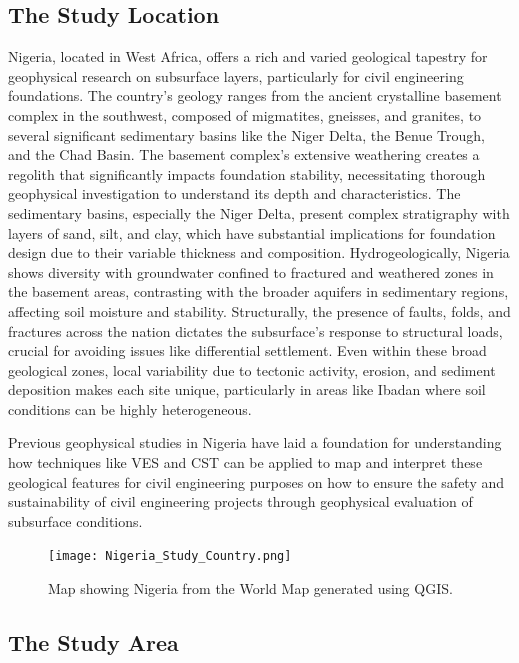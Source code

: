 \documentclass[12pt,a4paper]{report}
\begin{document}
\subsection{The Study Location}
Nigeria, located in West Africa, offers a rich and varied geological tapestry for geophysical research on subsurface layers, particularly for civil engineering foundations. The country's geology ranges from the ancient crystalline basement complex in the southwest, composed of migmatites, gneisses, and granites, to several significant sedimentary basins like the Niger Delta, the Benue Trough, and the Chad Basin. The basement complex's extensive weathering creates a regolith that significantly impacts foundation stability, necessitating thorough geophysical investigation to understand its depth and characteristics. The sedimentary basins, especially the Niger Delta, present complex stratigraphy with layers of sand, silt, and clay, which have substantial implications for foundation design due to their variable thickness and composition. Hydrogeologically, Nigeria shows diversity with groundwater confined to fractured and weathered zones in the basement areas, contrasting with the broader aquifers in sedimentary regions, affecting soil moisture and stability. Structurally, the presence of faults, folds, and fractures across the nation dictates the subsurface's response to structural loads, crucial for avoiding issues like differential settlement. Even within these broad geological zones, local variability due to tectonic activity, erosion, and sediment deposition makes each site unique, particularly in areas like Ibadan where soil conditions can be highly heterogeneous.

Previous geophysical studies in Nigeria have laid a foundation for understanding how techniques like VES and CST can be applied to map and interpret these geological features for civil engineering purposes on how to ensure the safety and sustainability of civil engineering projects through geophysical evaluation of subsurface conditions. \\

\begin{figure}[H]
    \centering
    \texttt{[image: Nigeria\_Study\_Country.png]}
    \caption{Map showing Nigeria from the World Map generated using QGIS.}
\end{figure}

\subsection{The Study Area}
\end{document}
